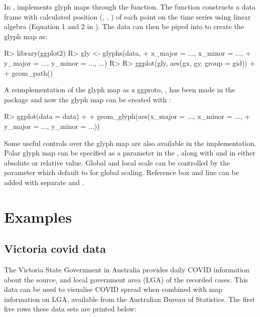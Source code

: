 \documentclass[
]{jss}
\begin{document}
In ,  implements glyph maps through the  function. The function constructs a data frame with calculated position (, , ) of each point on the time series using linear algebra (Equation 1 and 2 in \citet{Wickham2012-yr}). The data can then be piped into  to create the glyph map as:

\begin{CodeChunk}
\begin{CodeInput}
R> library(ggplot2)
R> gly <- glyphs(data,
+               x_major = ..., x_minor = ...,
+               y_major = ..., y_minor = ..., ...)
R> 
R> ggplot(gly, aes(gx, gy, group = gid)) +
+   geom_path()
\end{CodeInput}
\end{CodeChunk}

A reimplementation of the glyph map as a ggproto, , has been made in the  package and now the glyph map can be created with :

\begin{CodeChunk}
\begin{CodeInput}
R> ggplot(data = data) +
+   geom_glyph(aes(x_major = ..., x_minor = ...,
+                  y_major = ..., y_minor = ...))
\end{CodeInput}
\end{CodeChunk}

Some useful controls over the glyph map are also available in the  implementation. Polar glyph map can be specified as a parameter  in the , along with  and  in either absolute or relative value. Global and local scale can be controlled by the parameter  which default to  for global scaling. Reference box and line can be added with separate  and .

\hypertarget{examples}{%
\section{Examples}\label{examples}}

\hypertarget{covid}{%
\subsection{Victoria covid data}\label{covid}}

The Victoria State Government in Australia provides daily COVID information about the source, and local government area (LGA) of the recorded cases. This data can be used to visualise COVID spread when combined with map information on LGA, available from the Australian Bureau of Statistics. The first five rows these data sets are printed below:
\end{document}
